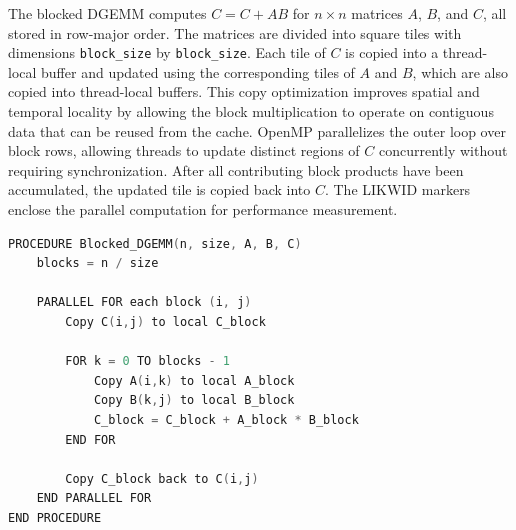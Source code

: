 The blocked DGEMM computes \(C = C + AB\) for \(n \times n\) matrices \(A\), \(B\), and \(C\), all stored in row-major order. The matrices are divided into square tiles with dimensions \texttt{block\_size} by \texttt{block\_size}. Each tile of \(C\) is copied into a thread-local buffer and updated using the corresponding tiles of \(A\) and \(B\), which are also copied into thread-local buffers. This copy optimization improves spatial and temporal locality by allowing the block multiplication to operate on contiguous data that can be reused from the cache. OpenMP parallelizes the outer loop over block rows, allowing threads to update distinct regions of \(C\) concurrently without requiring synchronization. After all contributing block products have been accumulated, the updated tile is copied back into \(C\). The LIKWID markers enclose the parallel computation for performance measurement. 

\begin{lstlisting}[caption={Blocked DGEMV OMP pseudocode implementation}, label={lst:blocked_dgemv}, name=dgemm_blocked_omp, style=mystyle,language=C++]
PROCEDURE Blocked_DGEMM(n, size, A, B, C)
    blocks = n / size

    PARALLEL FOR each block (i, j)
        Copy C(i,j) to local C_block

        FOR k = 0 TO blocks - 1
            Copy A(i,k) to local A_block
            Copy B(k,j) to local B_block
            C_block = C_block + A_block * B_block
        END FOR

        Copy C_block back to C(i,j)
    END PARALLEL FOR
END PROCEDURE
\end{lstlisting}
